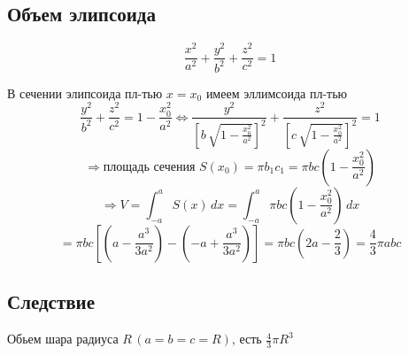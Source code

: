 {\subsection*{Объем элипсоида}
\[
\frac{x^2}{a^2} + \frac{y^2}{b^2} + \frac{z^2}{c^2} = 1
\]

В сечении элипсоида пл-тью \( x = x_0\) имеем эллимсоида пл-тью
\[
\frac{y^2}{b^2} + \frac{z^2}{c^2} = 1 - \frac{x_0^2}{a^2} \iff \frac{y^2}{\left[ b \, \sqrt{1 - \frac{x_0^2}{a^2}}\right]^2} + \frac{z^2}{\left[ c  \, \sqrt{1 - \frac{x_0^2}{a^2}}\right]^2} = 1
\]
\[ \Rightarrow \text{площадь сечения } S(x_0) = \pi b_1 c_1 = \pi b c \left( 1- \frac{x_0^2}{a^2} \right)\]
\[ \Rightarrow V = \int_{-a}^{a}{S(x) \, dx} = \int_{-a}^{a}{\pi b c \left( 1- \frac{x_0^2}{a^2} \right)} \, dx \]  
\[= \pi b c \left[ (a - \frac{a^3}{3a^2}) - (-a + \frac{a^3}{3a^2}) \right] = \pi b c \left( 2a-\frac{2}{3} \right) = \frac{4}{3}\pi a b c\]
\subsection*{Следствие}
Обьем шара радиуса \( R \, (a=b=c=R)\), есть \(\frac{4}{3}\pi R^3\)
}